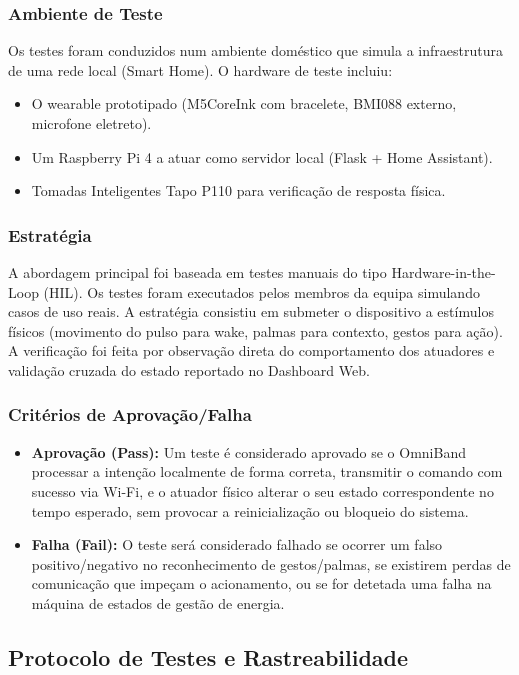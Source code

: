 \documentclass[11pt, a4paper]{article}
\begin{document}
\subsubsection{Ambiente de Teste}
Os testes foram conduzidos num ambiente doméstico que simula a infraestrutura de uma rede local (Smart Home). O hardware de teste incluiu:
\begin{itemize}
    \item O wearable prototipado (M5CoreInk com bracelete, BMI088 externo, microfone eletreto).
    \item Um Raspberry Pi 4 a atuar como servidor local (Flask + Home Assistant).
    \item Tomadas Inteligentes Tapo P110 para verificação de resposta física.
\end{itemize}

\subsubsection{Estratégia}
A abordagem principal foi baseada em testes manuais do tipo Hardware-in-the-Loop (HIL). Os testes foram executados pelos membros da equipa simulando casos de uso reais. A estratégia consistiu em submeter o dispositivo a estímulos físicos (movimento do pulso para wake, palmas para contexto, gestos para ação). A verificação foi feita por observação direta do comportamento dos atuadores e validação cruzada do estado reportado no Dashboard Web.

\subsubsection{Critérios de Aprovação/Falha}
\begin{itemize}
    \item \textbf{Aprovação (Pass):} Um teste é considerado aprovado se o OmniBand processar a intenção localmente de forma correta, transmitir o comando com sucesso via Wi-Fi, e o atuador físico alterar o seu estado correspondente no tempo esperado, sem provocar a reinicialização ou bloqueio do sistema.
    \item \textbf{Falha (Fail):} O teste será considerado falhado se ocorrer um falso positivo/negativo no reconhecimento de gestos/palmas, se existirem perdas de comunicação que impeçam o acionamento, ou se for detetada uma falha na máquina de estados de gestão de energia.
\end{itemize}

\subsection{Protocolo de Testes e Rastreabilidade}
\end{document}
